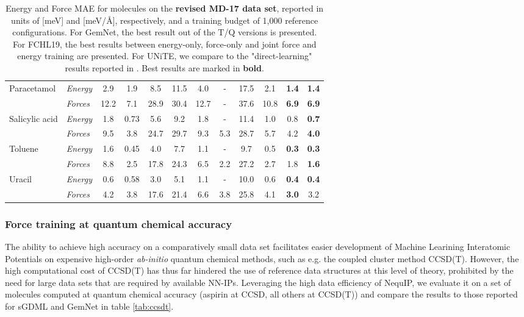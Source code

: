 \documentclass[11pt]{article}
\begin{document}
\begin{table}[!htbp]
{\begin{tabular}{llcccccccccc}
\multirow{2}{*}{Paracetamol}  & \textit{Energy} & 2.9 &  1.9 & 8.5 & 11.5 & 4.0  & - & 17.5 & 2.1 & \textbf{1.4} & \textbf{1.4}  \\ 
                          & \textit{Forces} & 12.2 & 7.1  & 28.9 & 30.4 & 12.7 & - & 37.6 & 10.8 &\textbf{ 6.9} & \textbf{ 6.9} \\ \hline

\multirow{2}{*}{Salicylic acid}  & \textit{Energy} & 1.8 & 0.73& 5.6 & 9.2  & 1.8 &  - & 11.4 & 1.0 & 0.8  &\textbf{ 0.7 } \\ 
                          & \textit{Forces} & 9.5 & 3.8 & 24.7 & 29.7 & 9.3 & 5.3 & 28.7 & 5.7 & 4.2 & \textbf{4.0 }\\ \hline
                          
\multirow{2}{*}{Toluene}  & \textit{Energy} & 1.6 & 0.45 & 4.0 & 7.7 & 1.1 & - & 9.7 & 0.5  & \textbf{0.3}  &  \textbf{0.3} \\ 
                          & \textit{Forces} & 8.8 & 2.5 & 17.8 & 24.3 & 6.5 & 2.2 & 27.2 & 2.7 & 1.8 & \textbf{1.6} \\ \hline
                          
\multirow{2}{*}{Uracil}  & \textit{Energy} & 0.6 & 0.58 & 3.0 & 5.1 & 1.1 & - & 10.0 & 0.6&\textbf{ 0.4} &\textbf{ 0.4 } \\ 
                          & \textit{Forces} & 4.2 & 3.8 & 17.6 & 21.4 & 6.6 & 3.8 & 25.8 & 4.1 &\textbf{ 3.0} & 3.2  \\ \hline
  \hline \hline
    \end{tabular}}
    \caption{Energy and Force MAE for molecules on the \textbf{revised MD-17 data set}, reported in units of [meV] and [meV/{\AA}], respectively, and a training budget of 1,000 reference configurations. For GemNet, the best result out of the T/Q versions is presented. For FCHL19, the best results between energy-only, force-only and joint force and energy training are presented. For UNiTE, we compare to the "direct-learning" results reported in \cite{qiao2021unite}. Best results are marked in \textbf{bold}. }
    \label{tab:revmd17}
\end{table}

\subsubsection{Force training at quantum chemical accuracy}
The ability to achieve high accuracy on a comparatively small data set facilitates easier development of Machine Learining Interatomic Potentials on expensive high-order \textit{ab-initio} quantum chemical methods, such as e.g. the coupled cluster method CCSD(T). However, the high computational cost of CCSD(T) has thus far hindered the use of reference data structures at this level of theory, prohibited by the need for large data sets that are required by available NN-IPs. Leveraging the high data efficiency of NequIP, we evaluate it on a set of molecules computed at quantum chemical accuracy (aspirin at CCSD, all others at CCSD(T)) \cite{sgdml} and compare the results to those reported for sGDML \cite{sgdml} and GemNet \cite{klicpera2021gemnet} in table \ref{tab:ccsdt}.
\end{document}
